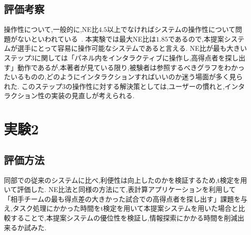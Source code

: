 \documentclass[sotsuron]{kuee}
\begin{document}
		\subsection{評価考察}
			操作性について,一般的に,NE比$4. 5$以上でなければシステムの操作性について問題がないといわれている~\cite{NEMratio}. 
			本実験では最大NE比は$1. 85$であるので,本提案システムが選手にとって容易に操作可能なシステムであると言える. 
			NE比が最も大きいステップ3に関しては「パネル内をインタラクティブに操作し,高得点者を探し出す」動作であるが,本著者が見ている限り,被験者は参照するべきグラフをわかったいるものの,どのようにインタラクションすればいいのか迷う場面が多く見られた. 
			このステップ3の操作性に対する解決策としては,ユーザーの慣れと,インタラクション性の実装の見直しが考えられる. 
	\section{実験2}
		\subsection{評価方法}
			同部での従来のシステムに比べ,利便性は向上したのかを検証するため,t検定を用いて評価した. 
			NE比法と同様の方法にて,表計算アプリケーションを利用して「相手チームの最も得点差の大きかった試合での高得点者を探し出す」課題を与え,タスク処理にかかった時間をt検定を用いて本提案システムを用いた場合と比較することで,本提案システムの優位性を検証し,情報探索にかかる時間を削減出来るか試みた. 
\end{document}
